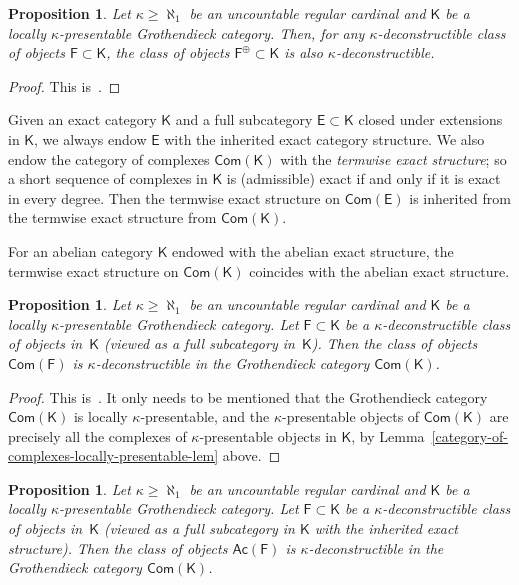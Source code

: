 \documentclass[12pt,a4paper]{amsart}
\newcommand{\+}{\protect\nobreakdash-}
\renewcommand{\:}{\colon}
\newcommand{\Com}{\mathsf{Com}}
\newcommand{\Ac}{\mathsf{Ac}}
\newcommand{\sE}{\mathsf E}
\newcommand{\sF}{\mathsf F}
\newcommand{\sK}{\mathsf K}
\theoremstyle{plain}
\newtheorem{prop}[thm]{Proposition}
\theoremstyle{definition}
\begin{document}
\begin{prop} \label{kaplansky-direct-summand-prop}
 Let\/ $\kappa\ge\aleph_1$ be an uncountable regular cardinal and\/
$\sK$ be a locally\/ $\kappa$\+presentable Grothendieck category.
 Then, for any\/ $\kappa$\+deconstructible class of objects\/
$\sF\subset\sK$, the class of objects\/ $\sF^\oplus\subset\sK$
is also\/ $\kappa$\+deconstructible.
\end{prop}

\begin{proof}
 This is~\cite[Proposition~2.9(1)]{Sto0}.
\end{proof}

 Given an exact category $\sK$ and a full subcategory $\sE\subset\sK$
closed under extensions in $\sK$, we always endow $\sE$ with
the inherited exact category structure.
 We also endow the category of complexes $\Com(\sK)$ with
the \emph{termwise exact structure}; so a short sequence of
complexes in $\sK$ is (admissible) exact if and only if it is
exact in every degree.
 Then the termwise exact structure on $\Com(\sE)$ is inherited from
the termwise exact structure from $\Com(\sK)$.

 For an abelian category $\sK$ endowed with the abelian exact
structure, the termwise exact structure on $\Com(\sK)$ coincides
with the abelian exact structure.

\begin{prop} \label{class-of-all-complexes-deconstructible-prop}
 Let\/ $\kappa\ge\aleph_1$ be an uncountable regular cardinal and\/
$\sK$ be a locally\/ $\kappa$\+presentable Grothendieck category.
 Let\/ $\sF\subset\sK$ be a\/ $\kappa$\+deconstructible class of
objects in\/~$\sK$ (viewed as a full subcategory in\/~$\sK$).
 Then the class of objects\/ $\Com(\sF)$ is\/ $\kappa$\+deconstructible
in the Grothendieck category\/ $\Com(\sK)$.
\end{prop}

\begin{proof}
 This is~\cite[Proposition~4.3]{Sto0}.
 It only needs to be mentioned that the Grothendieck category
$\Com(\sK)$ is locally $\kappa$\+presentable, and
the $\kappa$\+presentable objects of $\Com(\sK)$ are precisely
all the complexes of $\kappa$\+presentable objects in $\sK$,
by Lemma~\ref{category-of-complexes-locally-presentable-lem} above.
\end{proof}

\begin{prop} \label{class-of-acyclic-complexes-deconstructible-prop}
 Let\/ $\kappa\ge\aleph_1$ be an uncountable regular cardinal and\/
$\sK$ be a locally\/ $\kappa$\+presentable Grothendieck category.
 Let\/ $\sF\subset\sK$ be a\/ $\kappa$\+deconstructible class of
objects in\/~$\sK$ (viewed as a full subcategory in\/ $\sK$ with
the inherited exact structure).
 Then the class of objects\/ $\Ac(\sF)$ is\/ $\kappa$\+deconstructible
in the Grothendieck category\/ $\Com(\sK)$.
\end{prop}
\end{document}
